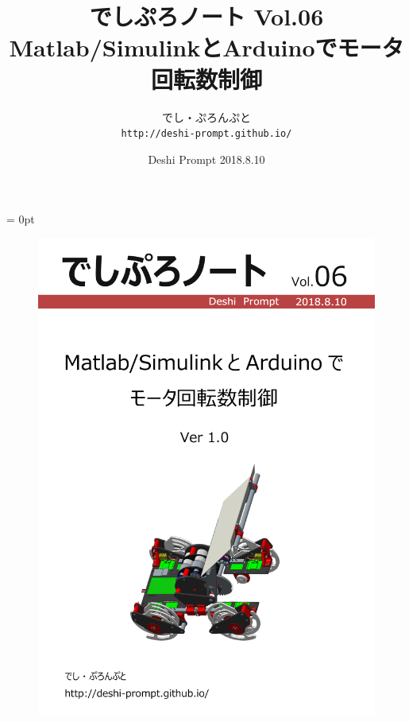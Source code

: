 \documentclass[a4paper,11pt,oneside,openany]{jsbook}
\title{{\Huge \textbf{でしぷろノート Vol.06}}\\ {Matlab/SimulinkとArduinoでモータ回転数制御}}
\author{でし・ぷろんぷと\\ \texttt{http://deshi-prompt.github.io/}}
\date{Deshi Prompt 2018.8.10}
\makeatletter
\renewcommand{\section}{\@startsection{section}{1}{\z@}%
   {0.5\Cvs \@plus0\Cvs \@minus 0.2\Cvs}%
   {0\Cvs \@plus0\Cvs \@minus 0.2\Cvs}%
   {\reset@font\Large\bfseries}}          %
\makeatother
\begin{document}
\parindent = 0pt %

\begin{titlepage}
    \begin{figure}[htbp]
        \centering
        \includegraphics[width=350pt]{fig/title.png}
    \end{figure}
    \thispagestyle{empty}
\end{titlepage}


\frontmatter %
\setcounter{tocdepth}{1} %
\tableofcontents %
\thispagestyle{empty} 
\mainmatter %
\end{document}
